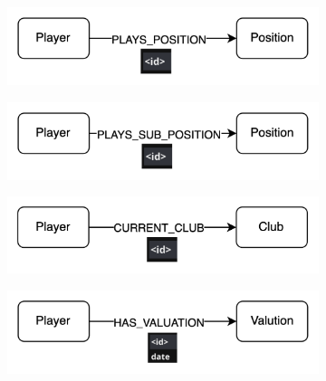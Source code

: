 \documentclass{Configuration_Files/PoliMi3i_thesis}
\begin{document}
\begin{figure}[H]
  \vspace{1em}


    \begin{subfigure}[b]{0.45\linewidth}
    \includegraphics[width=\linewidth]{Project Template/Images/relationships/playsposition.png}
  \end{subfigure}
  \hfill
  \begin{subfigure}[b]{0.45\linewidth}
    \includegraphics[width=\linewidth]{Project Template/Images/relationships/playssubposition.png}
  \end{subfigure}
  
  \vspace{1em}


    \begin{subfigure}[b]{0.45\linewidth}
    \includegraphics[width=\linewidth]{Project Template/Images/relationships/currentclub.png}
  \end{subfigure}
  \hfill
  \begin{subfigure}[b]{0.45\linewidth}
    \includegraphics[width=\linewidth]{Project Template/Images/relationships/hasvaluation.png}
  \end{subfigure}
  

\end{figure}
\end{document}
